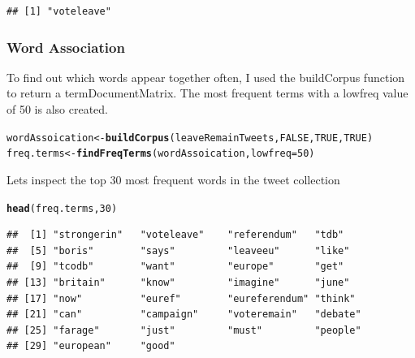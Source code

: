 \documentclass[10pt  ,usenames, dvipsnames]{article}\usepackage[]{graphicx}\usepackage[]{color}
\makeatletter
\newcommand{\hlnum}[1]{\textcolor[rgb]{0.686,0.059,0.569}{#1}}%
\newcommand{\hlstd}[1]{\textcolor[rgb]{0.345,0.345,0.345}{#1}}%
\newcommand{\hlkwb}[1]{\textcolor[rgb]{0.69,0.353,0.396}{#1}}%
\newcommand{\hlkwc}[1]{\textcolor[rgb]{0.333,0.667,0.333}{#1}}%
\newcommand{\hlkwd}[1]{\textcolor[rgb]{0.737,0.353,0.396}{\textbf{#1}}}%
\newenvironment{kframe}{%
 \def\at@end@of@kframe{}%
 \ifinner\ifhmode%
  \def\at@end@of@kframe{\end{minipage}}%
  \begin{minipage}{\columnwidth}%
 \fi\fi%
 \def\FrameCommand##1{\hskip\@totalleftmargin \hskip-\fboxsep
 \colorbox{shadecolor}{##1}\hskip-\fboxsep
     \hskip-\linewidth \hskip-\@totalleftmargin \hskip\columnwidth}%
 \MakeFramed {\advance\hsize-\width
   \@totalleftmargin\z@ \linewidth\hsize
   \@setminipage}}%
 {\par\unskip\endMakeFramed%
 \at@end@of@kframe}
\newenvironment{knitrout}{}{} %
\makeatother
\begin{document}
\begin{knitrout}
\color{fgcolor}\begin{kframe}
\begin{verbatim}
## [1] "voteleave"
\end{verbatim}
\end{kframe}
\end{knitrout}


\subsubsection{Word Association}


To find out which words appear together often, I used the buildCorpus function to return a termDocumentMatrix. The most frequent terms with a lowfreq value of 50 is also created.

\begin{knitrout}
\color{fgcolor}\begin{kframe}
\begin{alltt}
\hlstd{wordAssoication} \hlkwb{<-} \hlkwd{buildCorpus}\hlstd{(leaveRemainTweets,}\hlnum{FALSE}\hlstd{,}\hlnum{TRUE}\hlstd{,}\hlnum{TRUE}\hlstd{)}
\hlstd{freq.terms} \hlkwb{<-} \hlkwd{findFreqTerms}\hlstd{(wordAssoication,} \hlkwc{lowfreq} \hlstd{=}\hlnum{50}\hlstd{)}
\end{alltt}
\end{kframe}
\end{knitrout}





Lets inspect the top 30 most frequent words in the tweet collection


\begin{knitrout}
\color{fgcolor}\begin{kframe}
\begin{alltt}
\hlkwd{head}\hlstd{(freq.terms,}\hlnum{30}\hlstd{)}
\end{alltt}
\end{kframe}
\end{knitrout}

\begin{knitrout}
\color{fgcolor}\begin{kframe}
\begin{verbatim}
##  [1] "strongerin"   "voteleave"    "referendum"   "tdb"         
##  [5] "boris"        "says"         "leaveeu"      "like"        
##  [9] "tcodb"        "want"         "europe"       "get"         
## [13] "britain"      "know"         "imagine"      "june"        
## [17] "now"          "euref"        "eureferendum" "think"       
## [21] "can"          "campaign"     "voteremain"   "debate"      
## [25] "farage"       "just"         "must"         "people"      
## [29] "european"     "good"
\end{verbatim}
\end{kframe}
\end{knitrout}
\end{document}
